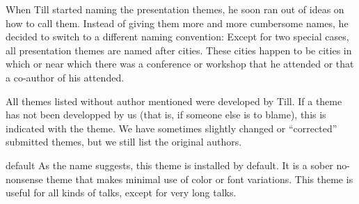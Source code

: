 When Till started naming the presentation themes, he soon ran out of ideas on how to call them. Instead of giving them more and more cumbersome names, he decided to switch to a different naming convention: Except for two special cases, all presentation themes are named after cities. These cities happen to be cities in which or near which there was a conference or workshop that he attended or that a co-author of his attended.

All themes listed without author mentioned were developed by Till. If a theme has not been developped by us (that is, if someone else is to blame), this is indicated with the theme. We have sometimes slightly changed or ``corrected'' submitted themes, but we still list the original authors.

\begin{themeexample}{default}
  As the name suggests, this theme is installed by default. It is a sober no-nonsense theme that makes minimal use of color or font variations. This theme is useful for all kinds of talks, except for very long talks.
\end{themeexample}

